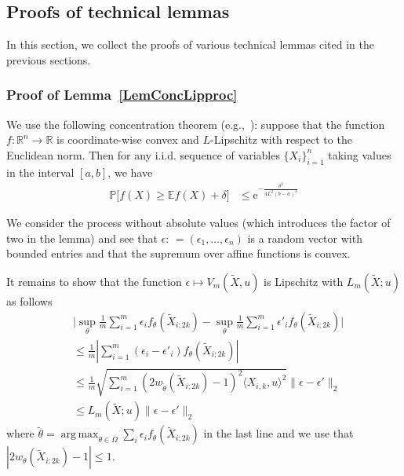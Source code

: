 \documentclass[twoside,11pt]{article}
\newcommand{\numobs}{\ensuremath{n}}
\DeclareMathOperator*{\argmax}{arg\, max}
\def\RN{ \mathbb{R} }						%
\def\EE{ \mathbb{E} }
\def\E{ \mathrm{e} }							%
\newcommand{\norm}[1]{\ensuremath{\|#1\|_2}}
\newcommand{\weightsingle}[2]{w_{#1}(#2)}
\newcommand{\paramjoint}{\theta}
\newcommand{\paramspacejoint}{\DomTheta}
\newcommand{\mprob}{\ensuremath{\mathbb{P}}}
\newcommand{\defn}{: \, = }
\newcommand{\DomTheta}{\ensuremath{\Omega}}
\newcommand{\Xtil}{\ensuremath{\widetilde{X}}}
\newcommand{\processradobs}{\ensuremath{V_m}}
\newcommand{\funcproc}{f_{\paramjoint}}
\newcommand{\blockXi}{\Xtil_{i;2k}}
\newcommand{\lipproc}{\ensuremath{L_m}}
\begin{document}

\subsection{Proofs of technical lemmas}
\label{SecNewTechnical}

In this section, we collect the proofs of various technical lemmas
cited in the previous sections.

\subsubsection{Proof of Lemma~\ref{LemConcLipproc}}

We use the following concentration theorem (e.g.,~\cite{Led96}):
suppose that the function $f:\RN^n \to \RN$ is coordinate-wise convex
and $L$-Lipschitz with respect to the Euclidean norm.  Then for any
i.i.d. sequence of variables $\{X_i\}_{i=1}^\numobs$ taking values in
the interval $[a,b]$, we have
\begin{align}
\mprob \big[f(X) \geq \EE f(X) + \delta \big] & \leq
\E^{-\frac{\delta^2}{4L^2(b-a)^2}}
\end{align}

We consider the process without absolute values
(which introduces the factor of two in the lemma) and see that
$\epsilon \defn (\epsilon_1, \dots, \epsilon_{n})$ is a random vector
with bounded entries and that the supremum over affine functions is
convex. 

It remains to show that the function $\epsilon \mapsto
\processradobs(\Xtil,u)$ is Lipschitz with $\lipproc(\Xtil;u)$ as follows
\begin{align*}
&\big| \sup_{\paramjoint} \frac{1}{m}\sum_{i=1}^m \epsilon_i
\funcproc(\blockXi) - \sup_{\paramjoint} \frac{1}{m}\sum_{i=1}^m
\epsilon'_i \funcproc(\blockXi) \big| \\
&\leq \frac{1}{m}|\sum_{i=1}^m
(\epsilon_i -\epsilon'_i)\funcproc(\blockXi)| \\ 
&\leq \frac{1}{m}\sqrt{\sum_{i=1}^m
  (2\weightsingle{\tilde{\paramjoint}}{\blockXi}-1)^2 \langle
  X_{i,k},u\rangle^2} \norm{\epsilon - \epsilon'}\\ &\leq
\lipproc(\Xtil;u) \norm{\epsilon -\epsilon'}
\end{align*}
where $\tilde{\paramjoint} = \argmax_{\paramjoint \in \paramspacejoint} \sum_i
\epsilon_i \funcproc(\blockXi)$ in the last line and we use that
$|2\weightsingle{\paramjoint}{\blockXi}-1| \leq 1$.
\end{document}

